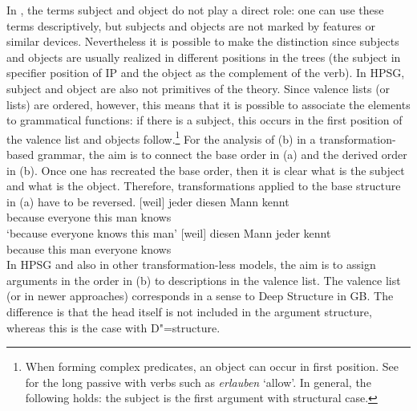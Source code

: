 In \gbt, the terms subject and object do not play a direct role: one can use
these terms descriptively, but subjects and objects are not marked by features or similar
devices. Nevertheless it is possible to make the distinction since subjects and objects are usually
realized in different positions in the trees (the subject in specifier position of IP and the object as the complement of the verb). In HPSG, subject and object
are also not primitives of the theory. Since valence lists (or \argst lists) are ordered, however,
this means that it is possible to associate the \argst elements to grammatical functions:
if there is a subject, this occurs in the first position of the valence list and objects follow.\footnote{
	When forming complex predicates, an object can occur in first position. See  for the long passive with verbs such as \emph{erlauben}
          `allow'. In general, the following holds: the subject is the first argument with structural case.%
} 
For the analysis of (b)  in a transformation-based grammar, the aim is to connect the base order in (a) and the derived order in (b).
Once one has recreated the base order, then it is clear what is the subject and what is the object. Therefore, transformations applied to the base
structure in (a) have to be reversed.
\eal
\ex 
\gll {}[weil] jeder diesen Mann kennt\\
	 {}\spacebr{}because everyone this man knows\\
\glt `because everyone knows this man'
\ex 
\gll {}[weil] diesen Mann jeder kennt\\
	 {}\spacebr{}because this man everyone knows\\
\zl
In HPSG and also in other transformation-less models, the aim is to assign arguments in the order in (b) to descriptions
in the valence list. The valence list (or \argst in newer approaches) corresponds in a sense to Deep Structure in GB.
The difference is that the head itself is not included in the argument structure, whereas this is the case with D"=structure.

